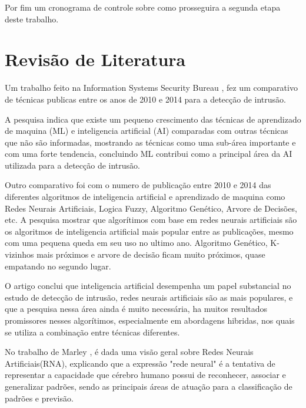 \documentclass[
	12pt,				%
	openright,			%
	oneside,
	a4paper,			%
	english,			%
	french,				%
	spanish,			%
	brazil				%
	]{abntex2}
\begin{document}
Por fim um cronograma de controle sobre como prosseguira a segunda etapa deste trabalho.


\chapter[Revisão de Literatura]{Revisão de Literatura}

Um trabalho feito na Information Systems Security Bureau \cite{Stampar}, fez um comparativo de técnicas publicas entre os anos de 2010 e 2014 para a detecção de intrusão.

A pesquisa indica que existe um pequeno crescimento das técnicas de aprendizado de maquina (ML) e inteligencia artificial (AI) comparadas com outras técnicas que não são informadas, mostrando as técnicas como uma sub-área importante e com uma forte tendencia, concluindo ML contribui como a principal área da AI utilizada para a detecção de intrusão.

Outro comparativo foi com o numero de publicação entre 2010 e 2014 das diferentes algoritmos de inteligencia artificial e aprendizado de maquina como Redes Neurais Artificiais, Logica Fuzzy, Algoritmo Genético, Arvore de Decisões, etc. A pesquisa mostrar que algorítimos com base em redes neurais artificiais são os algoritmos de inteligencia artificial mais popular entre as publicações, mesmo com uma pequena queda em seu uso no ultimo ano. Algoritmo Genético, K-vizinhos mais próximos e arvore de decisão ficam muito próximos, quase empatando no segundo lugar.

O artigo conclui que inteligencia artificial desempenha um papel substancial no estudo de detecção de intrusão, redes neurais artificiais  são as mais populares, e que a pesquisa nessa área ainda é muito necessária, ha muitos resultados promissores nesses algorítimos,  especialmente em abordagens hibridas, nos quais se utiliza a combinação entre técnicas diferentes.


No trabalho de Marley  \cite{Marley}, é dada uma visão geral sobre Redes Neurais Artificiais(RNA), explicando que a expressão "rede neural" é a tentativa de representar a capacidade que cérebro humano possui de reconhecer, associar e generalizar padrões, sendo as principais áreas de atuação para a classificação de padrões e previsão.
\end{document}
